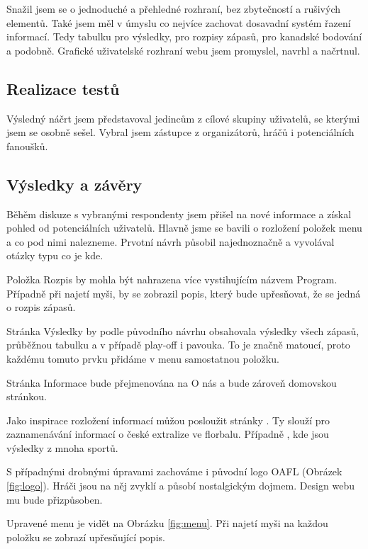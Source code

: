 \documentclass[11pt, a4paper, titlepage]{article}
\begin{document}
Snažil jsem se o jednoduché a přehledné rozhraní, bez zbytečností a rušivých elementů. Také jsem měl v úmyslu co nejvíce zachovat dosavadní systém řazení informací. Tedy tabulku pro výsledky, pro rozpisy zápasů, pro kanadské bodování a podobně. Grafické uživatelské rozhraní webu jsem promyslel, navrhl a načrtnul.

\subsection{Realizace testů}

Výsledný náčrt jsem představoval jedincům z cílové skupiny uživatelů, se kterými jsem se osobně sešel. Vybral jsem zástupce z organizátorů, hráčů i potenciálních fanoušků.

\subsection{Výsledky a závěry}

Běhěm diskuze s vybranými respondenty jsem přišel na nové informace a získal pohled od potenciálních uživatelů. Hlavně jsme se bavili o rozložení položek menu a co pod nimi nalezneme. Prvotní návrh působil najednoznačně a vyvolával otázky typu co je kde.
\medskip

Položka Rozpis by mohla být nahrazena více vystihujícím názvem Program. Případně při najetí myši, by se zobrazil popis, který bude upřesňovat, že se jedná o rozpis zápasů.
\medskip

Stránka Výsledky by podle původního návrhu obsahovala výsledky všech zápasů, průběžnou tabulku a v případě play-off i pavouka. To je značně matoucí, proto každému tomuto prvku přidáme v menu samostatnou položku.
\medskip

Stránka Informace bude přejmenována na O nás a bude zároveň domovskou stránkou.
\medskip

Jako inspirace rozložení informací můžou posloužit stránky . Ty slouží pro zaznamenávání informací o české extralize ve florbalu. Případně , kde jsou výsledky z mnoha sportů.
\medskip

S případnými drobnými úpravami zachováme i původní logo OAFL (Obrázek \ref{fig:logo}). Hráči jsou na něj zvyklí a působí nostalgickým dojmem. Design webu mu bude přizpůsoben.
\medskip

Upravené menu je vidět na Obrázku \ref{fig:menu}. Při najetí myši na každou položku se zobrazí upřesňující popis.
\end{document}
